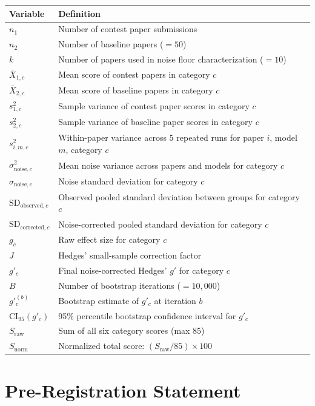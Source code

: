 \documentclass[11pt]{article}
\begin{document}
\begin{center}
\begin{tabular}{ll}
\toprule
\textbf{Variable} & \textbf{Definition} \\
\midrule
$n_1$ & Number of contest paper submissions \\
$n_2$ & Number of baseline papers ($= 50$) \\
$k$ & Number of papers used in noise floor characterization ($= 10$) \\
$\bar{X}_{1,c}$ & Mean score of contest papers in category $c$ \\
$\bar{X}_{2,c}$ & Mean score of baseline papers in category $c$ \\
$s^2_{1,c}$ & Sample variance of contest paper scores in category $c$ \\
$s^2_{2,c}$ & Sample variance of baseline paper scores in category $c$ \\
$s^2_{i,m,c}$ & Within-paper variance across 5 repeated runs for paper $i$, model $m$, category $c$ \\
$\sigma^2_{\text{noise},c}$ & Mean noise variance across papers and models for category $c$ \\
$\sigma_{\text{noise},c}$ & Noise standard deviation for category $c$ \\
$\text{SD}_{\text{observed},c}$ & Observed pooled standard deviation between groups for category $c$ \\
$\text{SD}_{\text{corrected},c}$ & Noise-corrected pooled standard deviation for category $c$ \\
$g_c$ & Raw effect size for category $c$ \\
$J$ & Hedges' small-sample correction factor \\
$g'_c$ & Final noise-corrected Hedges' $g'$ for category $c$ \\
$B$ & Number of bootstrap iterations ($= 10{,}000$) \\
$g'^{(b)}_c$ & Bootstrap estimate of $g'_c$ at iteration $b$ \\
$\text{CI}_{95}(g'_c)$ & 95\% percentile bootstrap confidence interval for $g'_c$ \\
$S_{\text{raw}}$ & Sum of all six category scores (max 85) \\
$S_{\text{norm}}$ & Normalized total score: $(S_{\text{raw}}/85) \times 100$ \\
\bottomrule
\end{tabular}
\end{center}

\section{Pre-Registration Statement}
\end{document}

